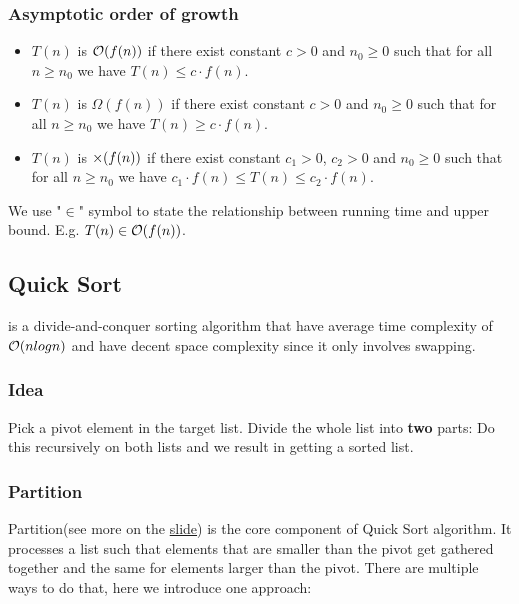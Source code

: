 \documentclass{ainote}
\begin{document}
\subsubsection{Asymptotic order of growth}
\begin{itemize}
    \item {} $T(n)$ is $\mathcal{O}(f(n))$ if there exist constant $c>0$ and $n_0 \ge 0$ such that for all $n\ge n_0$ we have $T(n)\le c\cdot f(n)$.
    \item {} $T(n)$ is $\Omega(f(n))$ if there exist constant $c>0$ and $n_0 \ge 0$ such that for all $n\ge n_0$ we have $T(n) \ge c\cdot f(n)$.
    \item {} $T(n)$ is $\mathcal{\Theta}(f(n))$ if there exist constant $c_1>0$, $c_2>0$ and $n_0 \ge 0$ such that for all $n\ge n_0$ we have $c_1\cdot f(n)\le T(n)\le c_2\cdot f(n)$.
\end{itemize}
\begin{info}
    We use "$\boldsymbol{\in}$" symbol to state the relationship between running time and upper bound. E.g. $T(n)\in \mathcal{O}(f(n))$.
\end{info}

\subsection{Quick Sort}
 is a divide-and-conquer sorting algorithm that have average time complexity of $\mathcal{O}(nlogn)$ and have decent space complexity since it only involves swapping.

\subsubsection{Idea}
Pick a pivot element in the target list. Divide the whole list into \textbf{two} parts:  Do this recursively on both lists and we result in getting a sorted list.

\subsubsection{Partition}
Partition(see more on the \href{https://www.cs.purdue.edu/homes/tamaldey/course/580/quicksort.pdf}{slide}) is the core component of Quick Sort algorithm. It processes a list such that elements that are smaller than the pivot get gathered together and the same for elements larger than the pivot. There are multiple ways to do that, here we introduce one approach:
\end{document}
